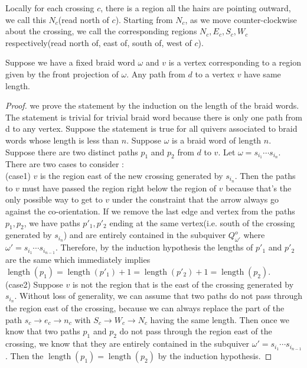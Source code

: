 \begin{definition}
	Locally for each crossing $c$, there is a region all the hairs are pointing outward, we call this $N_c$(read north of $c$). Starting from $N_c$, as we move counter-clockwise about the crossing, we call the corresponding regions $N_c,E_c,S_c,W_c$ respectively(read north of, east of, south of, west of $c$).
\end{definition}
\begin{theorem}
	Suppose we have a fixed braid word $\omega$ and $v$ is a vertex corresponding to a region given by the front projection of $\omega$. Any path from $d$ to a vertex $v$ have same length.
\end{theorem}
\begin{proof}
we prove the statement by the induction on the length of the braid words. The statement is trivial for trivial braid word because there is only one path from d to any vertex. Suppose the statement is true for all quivers associated to braid words whose length is less than $n$. Suppose $\omega$ is a braid word of length $n$. Suppose there are two distinct paths $p_1$ and $p_2$ from $d$ to $v$. Let $\omega = s_{i_1}\cdots s_{i_n}$. There are two cases to consider :\\
(case1) $v$ is the region east of the new crossing generated by $s_{i_n}$. Then the paths to $v$ must have passed the region right below the region of $v$ because that's the only possible way to get to $v$ under the constraint that the arrow always go against the co-orientation. If we remove the last edge and vertex from the paths $p_1,p_2$, we have paths $p'_1,p'_2$ ending at the same vertex(i.e. south of the crossing generated by $s_{i_n}$) and are entirely contained in the subquiver $Q^o_{\omega '}$ where $\omega ' = s_{i_1}\cdots s_{i_{n-1}}$. Therefore, by the induction hypothesis the lengths of $p'_1$ and $p'_2$ are the same which immediately implies $\operatorname{length}(p_1) = \operatorname{length}(p'_1) + 1 =\operatorname{length}(p'_2) + 1 = \operatorname{length}(p_2)$.\\
(case2) Suppose $v$ is not the region that is the east of the crossing generated by $s_{i_n}$. Without loss of generality, we can assume that two paths do not pass through the region east of the crossing, because we can always replace the part of the path $s_c\rightarrow e_c \rightarrow n_c$ with $S_c\rightarrow W_c \rightarrow N_c$ having the same length. Then once we know that two paths $p_1$ and $p_2$ do not pass through the region east of the crossing, we know that they are entirely contained in the subquiver $\omega ' = s_{i_1}\cdots s_{i_{n-1}}$. Then the $\operatorname{length}(p_1) = \operatorname{length}(p_2)$ by the induction hypothesis.
\end{proof}


